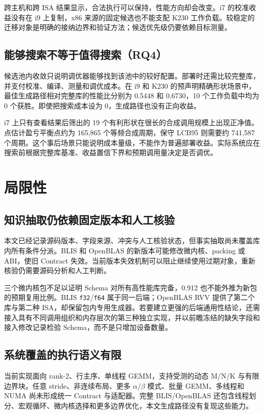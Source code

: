 跨主机和跨 ISA 结果显示，合法执行可以保持，性能方向却会改变。i7 的校准收益没有在 i9 上复制，x86 来源的固定候选也不能支配 K230 工作负载。较稳定的迁移对象是明确的接纳边界和验证方法；候选优先级仍要依赖目标测量。

\subsection{能够搜索不等于值得搜索（RQ4）}

候选池内收敛只说明调优器能够找到该池中的较好配置。部署时还需比较完整库，并支付校准、编译、测量和调优成本。在 i9 和 K230 的预声明精确形状场景中，最佳生成路径相对完整库的性能比分别为 0.5448 和 0.6730，10 个工作负载中均为 0 个获胜。即使把搜索成本设为 0，生成路径也没有正向收益。

i7 上只有查看结果后筛出的 19 个有利形状在很长的合成调用规模上出现正净值。点估计盈亏平衡点约为 165,865 个等频合成周期，保守 LCB95 则需要约 741,587 个周期。这个事后场景只能说明成本量级，不能作为普遍部署收益。实际系统应在搜索前根据完整库基准、收益置信下界和预期调用量决定是否调优。

\section{局限性}

\subsection{知识抽取仍依赖固定版本和人工核验}

本文已经记录源码版本、字段来源、冲突与人工核验状态，但事实抽取尚未覆盖库内所有条件分派。BLIS 和 OpenBLAS 的新版本可能修改微内核、packing 或 ABI，使旧 Contract 失效。当前版本失效机制可以阻止继续使用过期对象，重新核验仍需要源码分析和人工判断。

三个微内核包不足以证明 Schema 对所有高性能库完备，0.912 也不能外推为新包的预期复用比例。BLIS \texttt{f32}/\texttt{f64} 属于同一后端；OpenBLAS RVV 提供了第二个库与第二种 ISA，却保留包内专用生成器。若要建立更强的后端通用性结论，还需接入具有不同调用组织和内存层次的第三种独立实现，并以前瞻冻结的缺失字段和接入修改记录检验 Schema，而不是只增加设备数量。

\subsection{系统覆盖的执行语义有限}

当前实现面向 rank-2、行主序、单线程 GEMM，支持受测的动态 M/N/K 与有限边界块。任意 stride、非连续布局、更多 $\alpha/\beta$ 模式、批量 GEMM、多线程和 NUMA 尚未形成统一 Contract 与适配器。完整 BLIS/OpenBLAS 还包含线程划分、宏观循环、微内核选择和更多边界优化，本文生成路径没有复现这些能力。


